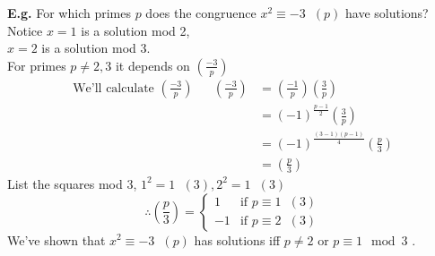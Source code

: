 \documentclass[11pt]{article}
\begin{document}
\textbf{E.g.} For which primes $p$ does the congruence $x^2 \equiv -3 \hspace{7pt} (p)$ have solutions? 
\\[0.5em]
Notice $x=1$ is a solution mod 2,\\
\hspace{30pt} $x=2$ is a solution mod 3.\\

For primes $p \neq 2,3 $ it depends on $(\frac{-3}{p})$\\


\begin{align*}
	\text{We'll calculate $(\frac{-3}{p})$} && (\frac{-3}{p}) &= (\frac{-1}{p})   (\frac{3}{p})\\
	&&&= (-1)^{\frac{p-1}{2}} (\frac{3}{p})\\
	&&&= (-1)^{\frac{(3-1)(p-1)}{4}}(\frac{p}{3})\\
	&&&= (\frac{p}{3})
\end{align*}
List the squares mod 3, $1^2 = 1 \hspace{7pt} (3), 2^2 = 1 \hspace{7pt} (3) $
\begin{equation*}
	\therefore (\frac{p}{3}) = 
	\begin{cases}
		1  &\text{if $p\equiv1 \hspace{7pt} (3)$}\\
		-1 & \text{if $p\equiv 2 \hspace{7pt} (3)$} 
	\end{cases}
\end{equation*}
We've shown that $x^2 \equiv -3\hspace{7pt} (p)$ has solutions iff $p \neq 2 \text{ or } p \equiv 1 \mod 3$ .






	
\end{document}
